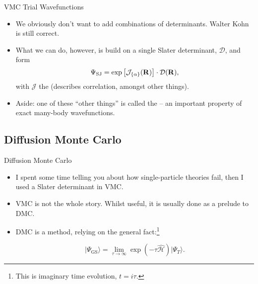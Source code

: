 \documentclass[12pt, pdf, hyperref={draft}, usenames, dvipsnames]{beamer}
\newcommand{\ket}[1]{\lvert{#1}\rangle}
\newcommand{\red}[1]{{\bf\color{LancsRed}{#1}}}
\newcommand{\blue}[1]{{\bf\color{NavyBlue}{#1}}}
\newcommand{\green}[1]{{\bf\color{ForestGreen}{#1}}}
\begin{document}
\begin{frame}{VMC Trial Wavefunctions}
\begin{itemize}
  \item We obviously don't want to add combinations of determinants.
  Walter Kohn is still correct.

  \item What we can do, however, is build on a single Slater determinant,
  $\mathcal{D}$, and form
  \begin{equation}
    \Psi_{\text{SJ}} = \exp{\left[ \mathcal{J}_{\{\alpha\}}({\bf R})\right]}
    \cdot \mathcal{D}({\bf R}),
  \end{equation}
  with $\mathcal{J}$ the \green{Jastrow exponent} (describes
  correlation, amongst other things).

  \item Aside: one of these ``other things'' is called the \green{Kato cusp
  condition} -- an important property of exact many-body wavefunctions.
\end{itemize}
\end{frame}

\subsection{Diffusion Monte Carlo}

\begin{frame}{Diffusion Monte Carlo}
\begin{itemize}
  \item I spent some time telling you about how single-particle theories fail,
  then I used a Slater determinant in VMC\@. \red{Why is this reasonable?}

  \item VMC is not the whole story. Whilst useful, it is usually done as a
  prelude to DMC\@.

  \item DMC is a \blue{projector-based} method, relying on the general
  fact:\footnote{This is imaginary time evolution, $t = i\tau$.}

  \begin{equation}
    \ket{\Psi_{\text{GS}}} = \lim_{\tau \rightarrow \infty} \exp{\left(-\tau
    \mathcal{\hat H} \right)}\ket{\Psi_T}.
  \end{equation}
\end{itemize}
\end{frame}
\end{document}
